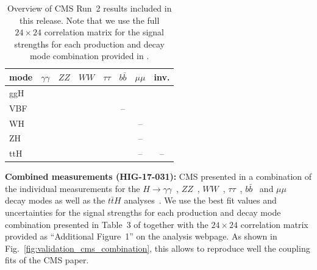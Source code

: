 \begin{table}[h]\centering
\begin{tabular}{l | ccccccc}
mode & $\gamma\gamma$ & $ZZ$ & $WW$ & $\tau\tau$ & $b\bar b$ & $\mu\mu$ & inv. \\
\hline
ggH & \cite{Sirunyan:2018koj} & \cite{Sirunyan:2018koj} & \cite{Sirunyan:2018koj} & \cite{Sirunyan:2018koj} & \cite{Sirunyan:2018koj} & \cite{Sirunyan:2018koj} & \cite{Sirunyan:2018owy} \\
VBF &  \cite{Sirunyan:2018koj} & \cite{Sirunyan:2018koj} & \cite{Sirunyan:2018koj} & \cite{Sirunyan:2018koj} &-- & \cite{Sirunyan:2018koj} & \cite{Sirunyan:2018owy} \\
WH &  \cite{Sirunyan:2018koj} & \cite{Sirunyan:2018koj} & \cite{Sirunyan:2018koj} & \cite{Sirunyan:2018cpi} & \cite{Sirunyan:2018koj} & -- & \cite{Sirunyan:2018owy} \\
ZH & \cite{Sirunyan:2018koj} & \cite{Sirunyan:2018koj} & \cite{Sirunyan:2018koj} & \cite{Sirunyan:2018cpi} & \cite{Sirunyan:2018koj} & -- & \cite{Sirunyan:2018owy} \\
ttH & \cite{Sirunyan:2018koj} & \cite{Sirunyan:2018koj} & \cite{Sirunyan:2018koj} & \cite{Sirunyan:2018koj} & \cite{Sirunyan:2018koj} & -- & -- \\
\end{tabular}
\caption{Overview of CMS Run~2 results included in this release. Note that we use the full $24\times 24$ correlation matrix 
for the signal strengths for each production and decay mode combination provided in \cite{Sirunyan:2018koj}.}
\label{tab:CMSresults}
\end{table}


{\bf\boldmath Combined measurements (HIG-17-031):} 
CMS presented in \cite{Sirunyan:2018koj} a combination of the individual measurements for the 
$H\to \gamma\gamma$~\cite{Sirunyan:2018ouh}, $ZZ$~\cite{Sirunyan:2017exp}, $WW$~\cite{Sirunyan:2018egh}, 
$\tau\tau$~\cite{Sirunyan:2017khh}, $b\bar b$~\cite{Sirunyan:2017elk,Sirunyan:2017dgc} and $\mu\mu$~\cite{Sirunyan:2018hbu} 
decay modes as well as the $t\bar tH$ analyses~\cite{Sirunyan:2018shy,Sirunyan:2018mvw,Sirunyan:2018ygk}. 
We use the best fit values and uncertainties for the signal strengths for each production %
and decay  %
mode combination presented in Table~3 of \cite{Sirunyan:2018koj} together with the $24\times 24$ correlation matrix 
provided as ``Additional Figure~1'' on the analysis webpage. As shown in Fig.~\ref{fig:validation_cms_combination}, 
this allows to reproduce well the coupling fits of the CMS paper.\\

